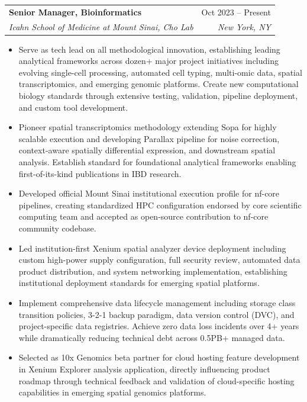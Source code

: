 \documentclass[letterpaper,10]{article}
\makeatletter
\newcommand{\resumeItem}[1]{
  \item\small{
    {#1 \vspace{-2pt}}
  }
}
\newcommand{\resumeSubheading}[4]{
  \vspace{-2pt}\item
    \begin{tabular*}{0.97\textwidth}[t]{l@{\extracolsep{\fill}}r}
      \textbf{#1} & #2 \\
      \textit{\small#3} & \textit{\small #4} \\
    \end{tabular*}\vspace{-7pt}
}
\newcommand{\resumeItemListStart}{\begin{itemize}}
\newcommand{\resumeItemListEnd}{\end{itemize}\vspace{-5pt}}
\makeatother
\begin{document}
    \resumeSubheading
      {Senior Manager, Bioinformatics}{Oct 2023 -- Present}
      {Icahn School of Medicine at Mount Sinai, Cho Lab}{New York, NY}
      \resumeItemListStart
        \resumeItem{Serve as tech lead on all methodological innovation, establishing leading analytical frameworks across dozen+ major project initiatives including evolving single-cell processing, automated cell typing, multi-omic data, spatial transcriptomics, and emerging genomic platforms. Create new computational biology standards through extensive testing, validation, pipeline deployment, and custom tool development.}
        \resumeItem{Pioneer spatial transcriptomics methodology extending Sopa for highly scalable execution and developing Parallax pipeline for noise correction, context-aware spatially differential expression, and downstream spatial analysis. Establish standard for foundational analytical frameworks enabling first-of-its-kind publications in IBD research.}
        \resumeItem{Developed official Mount Sinai institutional execution profile for nf-core pipelines, creating standardized HPC configuration endorsed by core scientific computing team and accepted as open-source contribution to nf-core community codebase.}
        \resumeItem{Led institution-first Xenium spatial analyzer device deployment including custom high-power supply configuration, full security review, automated data product distribution, and system networking implementation, establishing institutional deployment standards for emerging spatial platforms.}
        \resumeItem{Implement comprehensive data lifecycle management including storage class transition policies, 3-2-1 backup paradigm, data version control (DVC), and project-specific data registries. Achieve zero data loss incidents over 4+ years while dramatically reducing technical debt across 0.5PB+ managed data.}
        \resumeItem{Selected as 10x Genomics beta partner for cloud hosting feature development in Xenium Explorer analysis application, directly influencing product roadmap through technical feedback and validation of cloud-specific hosting capabilities in emerging spatial genomics platforms.}
      \resumeItemListEnd
\end{document}
